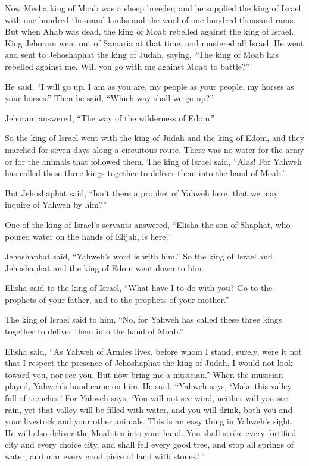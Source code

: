  Now Mesha king of Moab was a sheep breeder; and he
supplied the king of Israel with one hundred thousand lambs and the wool
of one hundred thousand rams.  But when Ahab was dead, the
king of Moab rebelled against the king of Israel.  King
Jehoram went out of Samaria at that time, and mustered all Israel.
 He went and sent to Jehoshaphat the king of Judah,
saying, ``The king of Moab has rebelled against me. Will you go with me
against Moab to battle?''

He said, ``I will go up. I am as you are, my people as your people, my
horses as your horses.''  Then he said, ``Which way shall
we go up?''

Jehoram answered, ``The way of the wilderness of Edom.''

 So the king of Israel went with the king of Judah and the
king of Edom, and they marched for seven days along a circuitous route.
There was no water for the army or for the animals that followed them.
 The king of Israel said, ``Alas! For Yahweh has called
these three kings together to deliver them into the hand of Moab.''

 But Jehoshaphat said, ``Isn't there a prophet of Yahweh
here, that we may inquire of Yahweh by him?''

One of the king of Israel's servants answered, ``Elisha the son of
Shaphat, who poured water on the hands of Elijah, is here.''

 Jehoshaphat said, ``Yahweh's word is with him.'' So the
king of Israel and Jehoshaphat and the king of Edom went down to him.

 Elisha said to the king of Israel, ``What have I to do
with you? Go to the prophets of your father, and to the prophets of your
mother.''

The king of Israel said to him, ``No, for Yahweh has called these three
kings together to deliver them into the hand of Moab.''

 Elisha said, ``As Yahweh of Armies lives, before whom I
stand, surely, were it not that I respect the presence of Jehoshaphat
the king of Judah, I would not look toward you, nor see you.
 But now bring me a musician.'' When the musician played,
Yahweh's hand came on him.  He said, ``Yahweh says, `Make
this valley full of trenches.'  For Yahweh says, `You
will not see wind, neither will you see rain, yet that valley will be
filled with water, and you will drink, both you and your livestock and
your other animals.  This is an easy thing in Yahweh's
sight. He will also deliver the Moabites into your hand. 
You shall strike every fortified city and every choice city, and shall
fell every good tree, and stop all springs of water, and mar every good
piece of land with stones.'\,''

